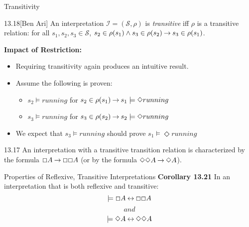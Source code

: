 \documentclass[style=sailor,size=12pt,mode=present]{powerdot}
\begin{document}
\begin{wideslide}[bm=,toc=]{Transitivity}
\begin{defn}{13.18}[Ben Ari]
An interpretation $\mathcal{I} = (\mathcal{S},\rho)$ is \emph{transitive}
iff $\rho$ is a transitive relation: for all $s_1,s_2,s_3 \in \mathcal{S}$, 
$s_2 \in \rho(s_1) \land s_3 \in \rho(s_2) \mathbin{\rightarrow} s_3 \in \rho(s_1)$.
\end{defn}
{\bf Impact of Restriction:}
\begin{itemize}
\item Requiring transitivity again produces an intuitive result.
\item Assume the following is proven:
\begin{itemize}
\item $s_2 \models running$ for $s_2 \in \rho(s_1) \mathbin{\rightarrow} s_1 \models \Diamond running$
\item $s_3 \models running$ for $s_3 \in \rho(s_2) \mathbin{\rightarrow} s_2 \models \Diamond running$
\end{itemize}
\item We expect that $s_3 \models running$ should prove $s_1 \models \Diamond running$ 
\end{itemize}
\begin{thm}{13.17}
An interpretation with a transitive transition relation is characterized by the
formula $\Box A \mathbin{\rightarrow} \Box \Box A$ (or by the formula 
$\Diamond \Diamond A \mathbin{\rightarrow} \Diamond A$).
\end{thm}
\end{wideslide}
\begin{wideslide}[bm=,toc=]{Properties of Reflexive, Transitive Interpretations}
{\bf Corollary 13.21}
In an interpretation that is both reflexive and transitive:
\[
\models \Box A \mathbin{\leftrightarrow} \Box \Box A
\]
\[and\]
\[
\models \Diamond A \mathbin{\leftrightarrow} \Diamond \Diamond A
\]

\end{wideslide}
\end{document}
